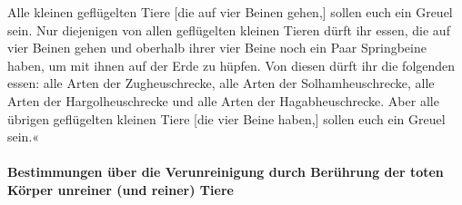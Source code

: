 Alle kleinen geflügelten Tiere {[}die auf vier Beinen
gehen,{]} sollen euch ein Greuel sein. Nur diejenigen von
allen geflügelten kleinen Tieren dürft ihr essen, die auf vier Beinen
gehen und oberhalb ihrer vier Beine noch ein Paar Springbeine haben, um
mit ihnen auf der Erde zu hüpfen. Von diesen dürft ihr
die folgenden essen: alle Arten der Zugheuschrecke, alle Arten der
Solhamheuschrecke, alle Arten der Hargolheuschrecke und alle Arten der
Hagabheuschrecke. Aber alle übrigen geflügelten kleinen
Tiere {[}die vier Beine haben,{]} sollen euch ein Greuel sein.«

\hypertarget{bestimmungen-uxfcber-die-verunreinigung-durch-beruxfchrung-der-toten-kuxf6rper-unreiner-und-reiner-tiere}{%
\paragraph{Bestimmungen über die Verunreinigung durch Berührung der
toten Körper unreiner (und reiner)
Tiere}\label{bestimmungen-uxfcber-die-verunreinigung-durch-beruxfchrung-der-toten-kuxf6rper-unreiner-und-reiner-tiere}}

